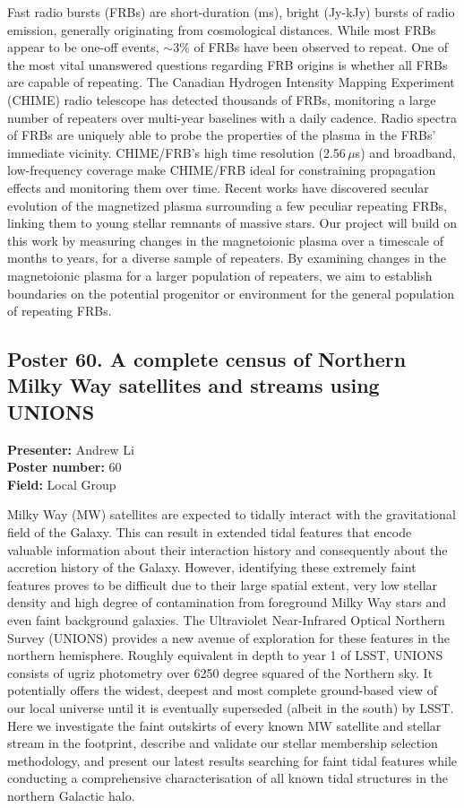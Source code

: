Fast radio bursts (FRBs) are short-duration (ms), bright (Jy-kJy) bursts of radio emission, generally originating from cosmological distances. While most FRBs appear to be one-off events, $\sim$3\% of FRBs have been observed to repeat. One of the most vital unanswered questions regarding FRB origins is whether all FRBs are capable of repeating. The Canadian Hydrogen Intensity Mapping Experiment (CHIME) radio telescope has detected thousands of FRBs, monitoring a large number of repeaters over multi-year baselines with a daily cadence. Radio spectra of FRBs are uniquely able to probe the properties of the plasma in the FRBs' immediate vicinity. CHIME/FRB's high time resolution (2.56\,$\mu$s) and broadband, low-frequency coverage make CHIME/FRB ideal for constraining propagation effects and monitoring them over time. Recent works have discovered secular evolution of the magnetized plasma surrounding a few peculiar repeating FRBs, linking them to young stellar remnants of massive stars. Our project will build on this work by measuring changes in the magnetoionic plasma over a timescale of months to years, for a diverse sample of repeaters. By examining changes in the magnetoionic plasma for a larger population of repeaters, we aim to establish boundaries on the potential progenitor or environment for the general population of repeating FRBs.

\hypertarget{poster-abstract-talk-338}{}\label{poster-abstract-page-talk-338}
\subsection*{Poster 60. A complete census of Northern Milky Way satellites and streams using UNIONS}
\textbf{Presenter:} Andrew Li\\
\textbf{Poster number:} 60\\
\textbf{Field:} Local Group

Milky Way (MW) satellites are expected to tidally interact with the gravitational field of the Galaxy. This can result in extended tidal features that encode valuable information about their interaction history and consequently about the accretion history of the Galaxy. However, identifying these extremely faint features proves to be difficult due to their large spatial extent, very low stellar density and high degree of contamination from foreground Milky Way stars and even faint background galaxies. The Ultraviolet Near-Infrared Optical Northern Survey (UNIONS) provides a new avenue of exploration for these features in the northern hemisphere. Roughly equivalent in depth to year 1 of LSST, UNIONS consists of ugriz photometry over 6250 degree squared of the Northern sky. It potentially offers the widest, deepest and most complete ground-based view of our local universe until it is eventually superseded (albeit in the south) by LSST. Here we investigate the faint outskirts of every known MW satellite and stellar stream in the footprint, describe and validate our stellar membership selection methodology, and present our latest results searching for faint tidal features while conducting a comprehensive characterisation of all known tidal structures in the northern Galactic halo.

